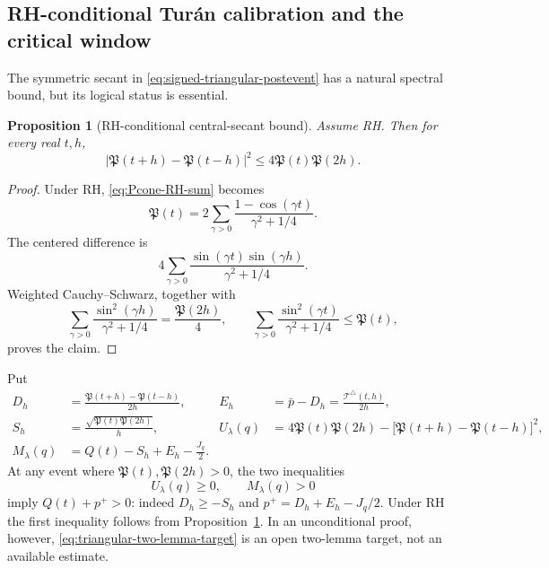 \documentclass[11pt,a4paper]{article}
\numberwithin{equation}{section}
\newtheorem{proposition}[theorem]{Proposition}
\theoremstyle{definition}
\begin{document}
\subsection{RH-conditional Tur\'an calibration and the critical window}

The symmetric secant in \eqref{eq:signed-triangular-postevent} has a natural
spectral bound, but its logical status is essential.

\begin{proposition}[RH-conditional central-secant bound]
\label{prop:conditional-turan}
Assume RH.  Then for every real \(t,h\),
\begin{equation}\label{eq:conditional-turan}
  \boxed{
  \left|\mathfrak P(t+h)-\mathfrak P(t-h)\right|^2
  \le4\mathfrak P(t)\mathfrak P(2h).
  }
\end{equation}
\end{proposition}

\begin{proof}
Under RH, \eqref{eq:Pcone-RH-sum} becomes
\[
  \mathfrak P(t)=2\sum_{\gamma>0}
  \frac{1-\cos(\gamma t)}{\gamma^2+1/4}.
\]
The centered difference is
\[
  4\sum_{\gamma>0}
  \frac{\sin(\gamma t)\sin(\gamma h)}{\gamma^2+1/4}.
\]
Weighted Cauchy--Schwarz, together with
\[
  \sum_{\gamma>0}\frac{\sin^2(\gamma h)}{\gamma^2+1/4}
  =\frac{\mathfrak P(2h)}4,
  \qquad
  \sum_{\gamma>0}\frac{\sin^2(\gamma t)}{\gamma^2+1/4}
  \le\mathfrak P(t),
\]
proves the claim.
\end{proof}

Put
\begin{align}
 D_h&=\frac{\mathfrak P(t+h)-\mathfrak P(t-h)}{2h},
 &
 E_h&=\bar p-D_h=\frac{\mathcal T^\triangle(t,h)}{2h},
 \label{eq:triangular-D-E}\\
 S_h&=\frac{\sqrt{\mathfrak P(t)\mathfrak P(2h)}}h,
 &
 U_\lambda(q)&=4\mathfrak P(t)\mathfrak P(2h)
 -\bigl[\mathfrak P(t+h)-\mathfrak P(t-h)\bigr]^2,
 \label{eq:triangular-S-U}\\
 M_\lambda(q)&=Q(t)-S_h+E_h-\frac{J_q}{2}.
 \label{eq:triangular-conditional-reserve}
\end{align}
At any event where \(\mathfrak P(t),\mathfrak P(2h)>0\), the two inequalities
\begin{equation}\label{eq:triangular-two-lemma-target}
  U_\lambda(q)\ge0,
  \qquad
  M_\lambda(q)>0
\end{equation}
imply \(Q(t)+p^+>0\): indeed \(D_h\ge-S_h\) and
\(p^+=D_h+E_h-J_q/2\).  Under RH the first inequality follows from
Proposition~\ref{prop:conditional-turan}.  In an unconditional proof,
however, \eqref{eq:triangular-two-lemma-target} is an open two-lemma target,
not an available estimate.
\end{document}
